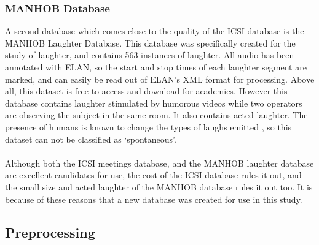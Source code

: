 \documentclass[a4paper,11pt,notitlepage]{article}
\begin{document}
\subsubsection{MANHOB Database}
A second database which comes close to the quality of the ICSI database is the MANHOB Laughter Database. This database was specifically created for the study of laughter, and contains 563 instances of laughter. All audio has been annotated with ELAN\cite{sloetjes2008annotation}, so the start and stop times of each laughter segment are marked, and can easily be read out of ELAN's XML format for processing. Above all, this dataset is free to access and download for academics. However this database contains laughter stimulated by humorous videos while two operators are observing the subject in the same room. It also contains acted laughter. The presence of humans is known to change the types of laughs emitted \cite{campbell2007whom}, so this dataset can not be classified as `spontaneous'.\\
\\
Although both the ICSI meetings database, and the MANHOB laughter database are excellent candidates for use, the cost of the ICSI database rules it out, and the small size and acted laughter of the MANHOB database rules it out too. It is because of these reasons that a new database was created for use in this study.

\subsection{Preprocessing}

\end{document}
